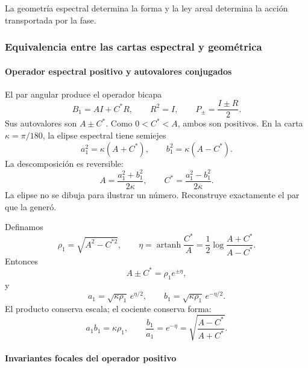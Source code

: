 \noindent La geometría espectral determina la forma y la ley areal determina la acción transportada por la fase.\par\medskip

\subsubsection{Equivalencia entre las cartas espectral y geométrica}

\paragraph{Operador espectral positivo y autovalores conjugados}

El par angular produce el operador bicapa
\begin{equation}
B_1=AI+C^*R,\qquad R^2=I,\qquad
P_\pm=\frac{I\pm R}{2}.
\label{eq:B1}
\end{equation}
Sus autovalores son \(A\pm C^*\). Como \(0<C^*<A\), ambos son positivos.
En la carta \(\kappa=\pi/180\), la elipse espectral tiene semiejes
\begin{equation}
a_1^2=\kappa(A+C^*),\qquad
b_1^2=\kappa(A-C^*).
\label{eq:semiejes-espectrales}
\end{equation}
La descomposición es reversible:
\begin{equation}
A=\frac{a_1^2+b_1^2}{2\kappa},\qquad
C^*=\frac{a_1^2-b_1^2}{2\kappa}.
\label{eq:reconstruccion-AC}
\end{equation}
La elipse no se dibuja para ilustrar un número. Reconstruye exactamente el
par que la generó.

Definamos
\begin{equation}
\rho_1=\sqrt{A^2-C^{*2}},\qquad
\eta=\operatorname{artanh}\frac{C^*}{A}
=\frac12\log\frac{A+C^*}{A-C^*}.
\label{eq:eta}
\end{equation}
Entonces
\[
A\pm C^*=\rho_1e^{\pm\eta},
\]
y
\begin{equation}
a_1=\sqrt{\kappa\rho_1}\,e^{\eta/2},
\qquad
b_1=\sqrt{\kappa\rho_1}\,e^{-\eta/2}.
\label{eq:semiejes-eta}
\end{equation}
El producto conserva escala; el cociente conserva forma:
\[
a_1b_1=\kappa\rho_1,
\qquad
\frac{b_1}{a_1}=e^{-\eta}
=\sqrt{\frac{A-C^*}{A+C^*}}.
\]

\paragraph{Invariantes focales del operador positivo}

